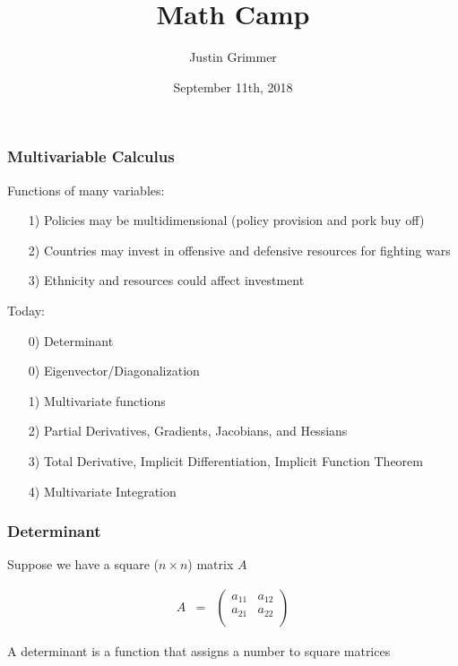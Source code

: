 \documentclass{beamer}
\title[Methodology I] %
{Math Camp}
\author{Justin Grimmer}
\institute[Stanford University]{Professor\\Department of Political Science \\Stanford University}
\date{September 11th, 2018}
\numberwithin{equation}{section}
\begin{document}
\begin{frame}
\maketitle
\end{frame}


\begin{frame}
\frametitle{\alert{Multivariable} Calculus}

\alert{Functions} of many variables:
\begin{itemize}
\item[1)] \alert{Policies} may be multidimensional (policy provision and pork buy off)
\item[2)] Countries may invest in \alert{offensive} and \alert{defensive} resources for fighting wars
\item[3)] Ethnicity and resources could affect \alert{investment}
\end{itemize}

Today: 
\begin{itemize}
\item[0)] Determinant 
\item[0)] Eigenvector/Diagonalization
\item[1)] Multivariate functions
\item[2)] Partial Derivatives, Gradients, Jacobians, and Hessians
\item[3)] Total Derivative, Implicit Differentiation, Implicit Function Theorem
\item[4)] Multivariate Integration
\end{itemize}

\end{frame}


\begin{frame}
\frametitle{Determinant}


Suppose we have a \alert{square} ($n \times n $) matrix $A$

\begin{eqnarray}
A & = & \begin{pmatrix}
a_{11} & a_{12} \\
a_{21} & a_{22} \\
\end{pmatrix} \nonumber
\end{eqnarray}

A determinant is a function that assigns a number to square matrices
\end{frame}
\end{document}
